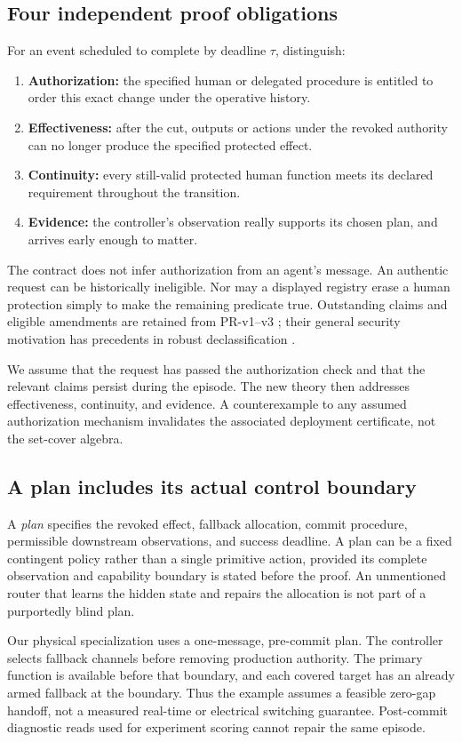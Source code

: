 \documentclass[11pt,a4paper]{article}
\theoremstyle{definition}\newtheorem{definition}{Definition}
\begin{document}
\subsection{Four independent proof obligations}
For an event scheduled to complete by deadline $\tau$, distinguish:
\begin{enumerate}
\item \textbf{Authorization:} the specified human or delegated procedure is entitled to order this exact change under the operative history.
\item \textbf{Effectiveness:} after the cut, outputs or actions under the revoked authority can no longer produce the specified protected effect.
\item \textbf{Continuity:} every still-valid protected human function meets its declared requirement throughout the transition.
\item \textbf{Evidence:} the controller's observation really supports its chosen plan, and arrives early enough to matter.
\end{enumerate}
The contract does not infer authorization from an agent's message. An authentic request can be historically ineligible. Nor may a displayed registry erase a human protection simply to make the remaining predicate true. Outstanding claims and eligible amendments are retained from PR-v1--v3 \cite{liu3}; their general security motivation has precedents in robust declassification \cite{myers}.

We assume that the request has passed the authorization check and that the relevant claims persist during the episode. The new theory then addresses effectiveness, continuity, and evidence. A counterexample to any assumed authorization mechanism invalidates the associated deployment certificate, not the set-cover algebra.

\subsection{A plan includes its actual control boundary}
A \emph{plan} specifies the revoked effect, fallback allocation, commit procedure, permissible downstream observations, and success deadline. A plan can be a fixed contingent policy rather than a single primitive action, provided its complete observation and capability boundary is stated before the proof. An unmentioned router that learns the hidden state and repairs the allocation is not part of a purportedly blind plan.

Our physical specialization uses a one-message, pre-commit plan. The controller selects fallback channels before removing production authority. The primary function is available before that boundary, and each covered target has an already armed fallback at the boundary. Thus the example assumes a feasible zero-gap handoff, not a measured real-time or electrical switching guarantee. Post-commit diagnostic reads used for experiment scoring cannot repair the same episode.
\end{document}
